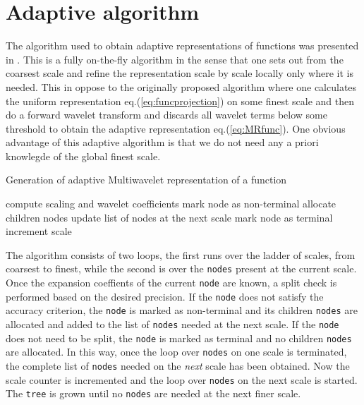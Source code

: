 \section{Adaptive algorithm}
The algorithm used to obtain adaptive representations of functions was 
presented in \cite{Fossgaard}. This is a fully on-the-fly algorithm in
the sense that one sets out from the coarsest scale and refine the
representation scale by scale locally only where it is needed. This in oppose
to the originally proposed algorithm where one calculates the uniform 
representation eq.(\ref{eq:funcprojection}) on some finest scale and then do a 
forward wavelet transform and discards all wavelet terms below some threshold 
to obtain the adaptive representation eq.(\ref{eq:MRfunc}). One obvious
advantage of this adaptive algorithm is that we do not need any a priori
knowlegde of the global finest scale.

\begin{algorithm}
	\caption{Generation of adaptive Multiwavelet representation of a function}
	\label{alg:function}
	\begin{algorithmic}[1]
			\STATE compute scaling and wavelet coefficients
				\STATE mark node as non-terminal
				\STATE allocate children nodes
				\STATE update list of nodes at the next scale
			\ELSE
				\STATE mark node as terminal
			\ENDIF
		\ENDFOR
		\STATE increment scale
	\ENDWHILE
	\end{algorithmic}
\end{algorithm}

\noindent
The algorithm consists of two loops, the first runs over the ladder of scales,
from coarsest to finest, while the second is over the \texttt{nodes} present at
the current scale. Once the expansion coeffients of the current \texttt{node} 
are known, a split check is performed based on the desired precision. If the
\texttt{node} does not satisfy the accuracy criterion, the \texttt{node} is 
marked as non-terminal and its children \texttt{nodes} are allocated and added 
to the list of \texttt{nodes} needed at the next scale. If the \texttt{node} 
does not need to be split, the \texttt{node} is marked as terminal and no 
children \texttt{nodes} are allocated. In this way, once the loop over 
\texttt{nodes} on one scale is terminated, the complete list of \texttt{nodes}
needed on the \emph{next} scale has been obtained. Now the scale counter is 
incremented and the loop over \texttt{nodes} on the next scale is started. The 
\texttt{tree} is grown until no \texttt{nodes} are needed at the next finer 
scale.\\

